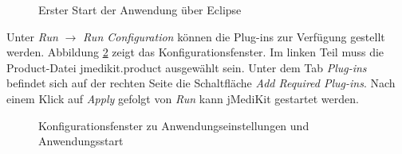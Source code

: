 \begin{figure}[H]
  \vspace{0.5cm}
  \centering
  \caption{Erster Start der Anwendung über Eclipse}
  \label{launchjmedikit}
  \vspace{0.5cm}
\end{figure}

Unter \textit{Run} $\rightarrow$ \textit{Run Configuration} können die Plug-ins zur Verfügung gestellt werden. Abbildung \ref{addplugins} zeigt das Konfigurationsfenster. Im linken Teil muss die Product-Datei jmedikit.product ausgewählt sein. Unter dem Tab \textit{Plug-ins} befindet sich auf der rechten Seite die Schaltfläche \textit{Add Required Plug-ins}. Nach einem Klick auf \textit{Apply} gefolgt von \textit{Run} kann jMediKit gestartet werden.

\begin{figure}[H]
  \vspace{0.5cm}
  \centering
  \caption{Konfigurationsfenster zu Anwendungseinstellungen und Anwendungsstart}
  \label{addplugins}
  \vspace{0.5cm}
\end{figure}

